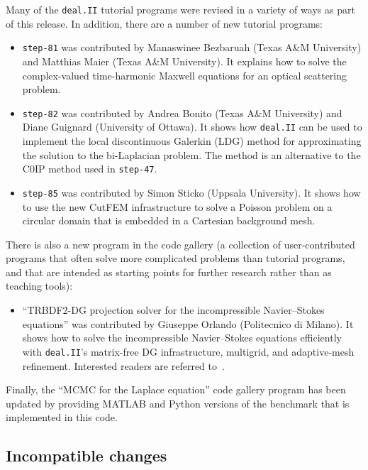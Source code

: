 \documentclass{ansarticle-preprint}
\newcommand{\specialword}[1]{\texttt{#1}}
\newcommand{\dealii}{{\specialword{deal.II}}\xspace}
\begin{document}
Many of the \dealii tutorial programs were revised in a variety of ways
as part of this release. In addition, there are a number of new tutorial
programs:
\begin{itemize}
  \item
    \texttt{step-81} was contributed by Manaswinee Bezbaruah (Texas A\&M
    University) and Matthias Maier (Texas A\&M University). It explains how
    to solve the complex-valued time-harmonic Maxwell equations for an
    optical scattering problem.
  \item
    \texttt{step-82} was contributed by Andrea Bonito (Texas A\&M
    University) and Diane Guignard (University of Ottawa). It shows how
    \dealii can be used to implement the local discontinuous Galerkin
    (LDG) method for approximating the solution to the bi-Laplacian
    problem. The method is an alternative to the C0IP method used in
    \texttt{step-47}.
  \item
    \texttt{step-85} was contributed by Simon Sticko (Uppsala University).
    It shows how to use the new CutFEM infrastructure to solve a Poisson
    problem on a circular domain that is embedded in a Cartesian background
    mesh.
\end{itemize}

There is also a new program in the code gallery (a collection of
user-contributed programs that often solve more complicated problems
than tutorial programs, and that are intended as starting points for further
research rather than as teaching tools):
\begin{itemize}
  \item ``TRBDF2-DG projection solver for the incompressible Navier--Stokes equations'' was contributed by Giuseppe Orlando (Politecnico di Milano). It shows
  how to solve the incompressible Navier--Stokes equations efficiently 
  with \dealii's matrix-free DG infrastructure, multigrid, and adaptive-mesh
  refinement. Interested readers are referred to~\cite{orlando2021efficient}.
\end{itemize}
Finally, the ``MCMC for the Laplace equation'' code gallery
program has been updated by providing MATLAB and Python versions of
the benchmark that is implemented in this code.



\subsection{Incompatible changes}\label{subsec:deprecated}
\end{document}
